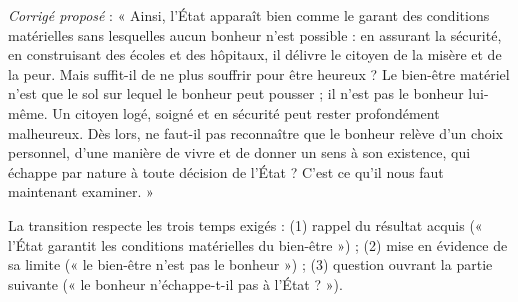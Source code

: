 \documentclass[11pt]{article}
\begin{document}
\begin{corrige}
\emph{Corrigé proposé} :
« Ainsi, l'État apparaît bien comme le garant des conditions matérielles sans lesquelles aucun bonheur n'est possible : en assurant la sécurité, en construisant des écoles et des hôpitaux, il délivre le citoyen de la misère et de la peur. Mais suffit-il de ne plus souffrir pour être heureux ? Le bien-être matériel n'est que le sol sur lequel le bonheur peut pousser ; il n'est pas le bonheur lui-même. Un citoyen logé, soigné et en sécurité peut rester profondément malheureux. Dès lors, ne faut-il pas reconnaître que le bonheur relève d'un choix personnel, d'une manière de vivre et de donner un sens à son existence, qui échappe par nature à toute décision de l'État ? C'est ce qu'il nous faut maintenant examiner. »
\begin{methode}
La transition respecte les trois temps exigés : (1) rappel du résultat acquis (« l'État garantit les conditions matérielles du bien-être ») ; (2) mise en évidence de sa limite (« le bien-être n'est pas le bonheur ») ; (3) question ouvrant la partie suivante (« le bonheur n'échappe-t-il pas à l'État ? »).
\end{methode}
\end{corrige}
\end{document}
